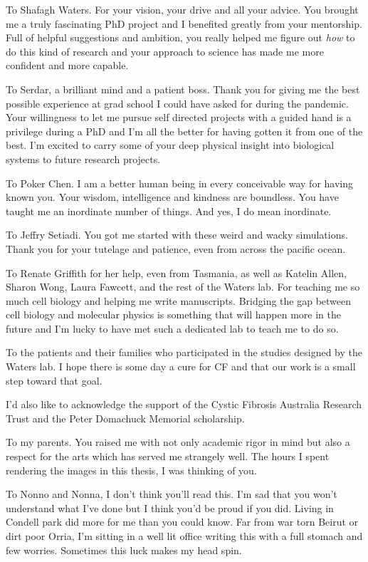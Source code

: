 To Shafagh Waters. For your vision, your drive and all your advice. You brought me a truly fascinating PhD project and I benefited greatly from your mentorship. Full of helpful suggestions and ambition, you really helped me figure out \textit{how} to do this kind of research and your approach to science has made me more confident and more capable.

To Serdar, a brilliant mind and a patient boss. Thank you for giving me the best possible experience at grad school I could have asked for during the pandemic. Your willingness to let me pursue self directed projects with a guided hand is a privilege during a PhD and I'm all the better for having gotten it from one of the best. I'm excited to carry some of your deep physical insight into biological systems to future research projects. 

To Poker Chen. I am a better human being in every conceivable way for having known you. Your wisdom, intelligence and kindness are boundless. You have taught me an inordinate number of things. And yes, I do mean inordinate.

To Jeffry Setiadi. You got me started with these weird and wacky simulations. Thank you for your tutelage and patience, even from across the pacific ocean.

To Renate Griffith for her help, even from Tasmania, as well as Katelin Allen, Sharon Wong, Laura Fawcett, and the rest of the Waters lab. For teaching me so much cell biology and helping me write manuscripts. Bridging the gap between cell biology and molecular physics is something that will happen more in the future and I'm lucky to have met such a dedicated lab to teach me to do so.

To the patients and their families who participated in the studies designed by the Waters lab. I hope there is some day a cure for CF and that our work is a small step toward that goal.

I'd also like to acknowledge the support of the Cystic Fibrosis Australia Research Trust and the Peter Domachuck Memorial scholarship.

To my parents. You raised me with not only academic rigor in mind but also a respect for the arts which has served me strangely well. The hours I spent rendering the images in this thesis, I was thinking of you.

To Nonno and Nonna, I don't think you'll read this. I'm sad that you won't understand what I've done but I think you'd be proud if you did. Living in Condell park did more for me than you could know. Far from war torn Beirut or dirt poor Orria, I'm sitting in a well lit office writing this with a full stomach and few worries. Sometimes this luck makes my head spin. 

